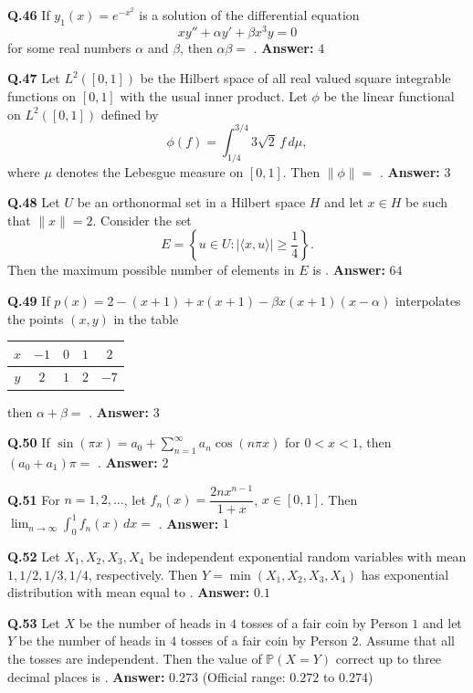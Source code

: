 \documentclass[11pt,a4paper]{article}
\newcommand{\ans}[1]{\textbf{Answer:} #1\par\medskip}
\begin{document}
\textbf{Q.46} If $y_1(x) = e^{-x^2}$ is a solution of the differential equation
\[
  x y'' + \alpha y' + \beta x^3 y = 0
\]
for some real numbers $\alpha$ and $\beta$, then $\alpha \beta =$ \underline{\hspace{2cm}}.
\ans{$4$}

\textbf{Q.47} Let $L^2([0, 1])$ be the Hilbert space of all real valued square integrable functions on $[0, 1]$ with the usual inner product. Let $\phi$ be the linear functional on $L^2([0, 1])$ defined by
\[
  \phi(f) = \int_{1/4}^{3/4} 3\sqrt{2}\, f\,d\mu,
\]
where $\mu$ denotes the Lebesgue measure on $[0, 1]$. Then $\|\phi\| =$ \underline{\hspace{2cm}}.
\ans{$3$}

\textbf{Q.48} Let $U$ be an orthonormal set in a Hilbert space $H$ and let $x \in H$ be such that $\|x\| = 2$. Consider the set
\[
  E = \left\{u \in U : |\langle x, u \rangle| \ge \frac{1}{4}\right\}.
\]
Then the maximum possible number of elements in $E$ is \underline{\hspace{2cm}}.
\ans{$64$}

\textbf{Q.49} If $p(x) = 2 - (x + 1) + x(x + 1) - \beta x(x + 1)(x - \alpha)$ interpolates the points $(x, y)$ in the table
\begin{center}
\begin{tabular}{c|c|c|c|c}
$x$ & $-1$ & $0$ & $1$ & $2$ \\
\hline
$y$ & $2$ & $1$ & $2$ & $-7$
\end{tabular}
\end{center}
then $\alpha + \beta =$ \underline{\hspace{2cm}}.
\ans{$3$}

\textbf{Q.50} If $\sin(\pi x) = a_0 + \sum_{n=1}^{\infty} a_n \cos(n\pi x)$ for $0 < x < 1$, then $(a_0 + a_1)\pi =$ \underline{\hspace{2cm}}.
\ans{$2$}

\textbf{Q.51} For $n = 1, 2, \dots$, let $f_n(x) = \dfrac{2n x^{n-1}}{1 + x}$, $x \in [0, 1]$. Then $\displaystyle\lim_{n\to\infty} \int_0^1 f_n(x)\,dx =$ \underline{\hspace{2cm}}.
\ans{$1$}

\textbf{Q.52} Let $X_1, X_2, X_3, X_4$ be independent exponential random variables with mean $1, 1/2, 1/3, 1/4$, respectively. Then $Y = \min(X_1, X_2, X_3, X_4)$ has exponential distribution with mean equal to \underline{\hspace{2cm}}.
\ans{$0.1$}

\textbf{Q.53} Let $X$ be the number of heads in $4$ tosses of a fair coin by Person $1$ and let $Y$ be the number of heads in $4$ tosses of a fair coin by Person $2$. Assume that all the tosses are independent. Then the value of $\mathbb{P}(X = Y)$ correct up to three decimal places is \underline{\hspace{2cm}}.
\ans{$0.273$ (Official range: $0.272$ to $0.274$)}
\end{document}
